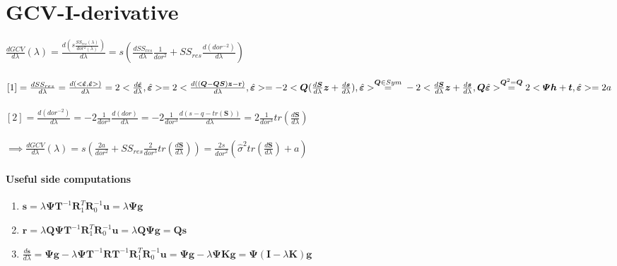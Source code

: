 \documentclass[11pt,twoside]{report}
\begin{document}
\section{GCV-I-derivative}
$ \frac{dGCV}{d\lambda}(\lambda) = \frac{d(s\frac{SS_{res}(\lambda)}{dor^2(\lambda)})}{d\lambda} = s (\frac{dSS_{res}}{d\lambda}\frac{1}{dor^2} + SS_{res}\frac{d(dor^{-2})}{d\lambda}) $\\
\\
$[1] = \frac{dSS_{res}}{d\lambda} = \frac{d(<\hat{\mathbold{\varepsilon}},\hat{\mathbold{\varepsilon}}> )}{d\lambda} = 2<\frac{d\hat{\mathbold{\varepsilon}}}{d\lambda},\hat{\mathbold{\varepsilon}}> = 2 < \frac{d((\mathbold{Q}-\mathbold{Q}\mathbold{S})\mathbold{z}-\mathbf{r})}{d\lambda}, \hat{\mathbold{\varepsilon}}> = -2<\mathbold{Q}(\frac{d\mathbold{S}}{d\lambda}\mathbold{z} + \frac{d\mathbold{s}}{d\lambda}), \hat{\mathbold{\varepsilon}}> \overset{\mathbold{Q}\in Sym}{=}\\ -2<\frac{d\mathbold{S}}{d\lambda}\mathbold{z} + \frac{d\mathbold{s}}{d\lambda},\mathbold{Q} \hat{\mathbold{\varepsilon}}> \overset{\mathbold{Q}^2 = \mathbold{Q}}{=} 2<\mathbold{\Psi}\mathbold{h}  +\mathbold{t}, \hat{\mathbold{\varepsilon}}> = 2a$\\
\\
$[2]= \frac{d(dor^{-2})}{d\lambda} = -2\frac{1}{dor^3}\frac{d(dor)}{d\lambda} = -2\frac{1}{dor^3}\frac{d(s-q-tr(\mathbold{S}))}{d\lambda} = 2\frac{1}{dor^3}tr(\frac{d\mathbold{S}}{d\lambda})$\\
\\
$\implies \frac{dGCV}{d\lambda}(\lambda) = s (\frac{2a}{dor^2} + SS_{res}\frac{2}{dor^3}tr(\frac{d\mathbold{S}}{d\lambda})) = \frac{2s}{{dor}^2}(\hat{\sigma}^2tr(\frac{d\mathbold{S}}{d\lambda}) + a)$

\paragraph{Useful side computations}
\begin{enumerate}
	\item $ \mathbf{s} = \lambda \boldsymbol{\Psi} \textbf{T}^{-1} \textbf{R}_1^T\textbf{R}_0^{-1}\textbf{u} = \lambda\boldsymbol{\Psi}\mathbf{g} $
	\item $ \mathbf{r} = \lambda \textbf{Q}\boldsymbol{\Psi} \textbf{T}^{-1} \textbf{R}_1^T\textbf{R}_0^{-1}\textbf{u} = \lambda \textbf{Q}\boldsymbol{\Psi}\mathbf{g} = \textbf{Q}\mathbf{s}$
	\item $ \frac{d\mathbold{s}}{d\lambda} = \boldsymbol{\Psi}\mathbf{g} - \lambda \boldsymbol{\Psi} \textbf{T}^{-1} \textbf{R}\textbf{T}^{-1} \textbf{R}_1^T\textbf{R}_0^{-1}\textbf{u} =\boldsymbol{\Psi}\mathbf{g} - \lambda \boldsymbol{\Psi} \textbf{K}\mathbf{g} = \boldsymbol{\Psi}(\mathbf{I}-\lambda\mathbf{K})\mathbf{g} $
\end{enumerate}
\end{document}
